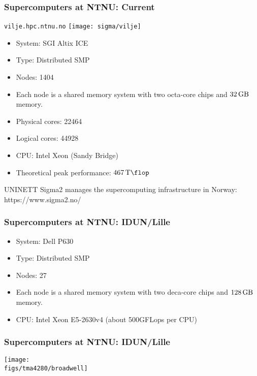 \begin{frame}
  \frametitle{Supercomputers at NTNU: Current}
  
\begin{minipage}[bc]{0.4\linewidth}
\centering
\texttt{vilje.hpc.ntnu.no}
\texttt{[image: sigma/vilje]}
\end{minipage}
\begin{minipage}[bc]{0.55\linewidth}
\begin{itemize}
  \item System: SGI Altix ICE
  \item Type: Distributed SMP
  \item Nodes: 1404
  \item Each node is a shared memory system with two octa-core chips and
    $\SI{32}{\giga\byte}$ memory.
  \item Physical cores: 22464
  \item Logical cores: 44928
  \item CPU: Intel Xeon (Sandy Bridge)
  \item Theoretical peak performance: $\SI{467}{\tera\flop}$
  \end{itemize}
\end{minipage}

UNINETT Sigma2 manages the supercomputing infrastructure in Norway:
https://www.sigma2.no/

\end{frame}

\begin{frame}
  \frametitle{Supercomputers at NTNU: IDUN/Lille}

\begin{minipage}[bc]{0.55\linewidth}
\begin{itemize}
  \item System: Dell P630
  \item Type: Distributed SMP
  \item Nodes: 27
  \item Each node is a shared memory system with two deca-core chips and
    $\SI{128}{\giga\byte}$ memory.
  \item CPU: Intel Xeon E5-2630v4 (about 500GFLops per CPU)
  \end{itemize}
\end{minipage}

\end{frame}


\begin{frame}
  \frametitle{Supercomputers at NTNU: IDUN/Lille}

\begin{center}
    \texttt{[image: \\figs/tma4280/broadwell]}
  \end{center}

\end{frame}

